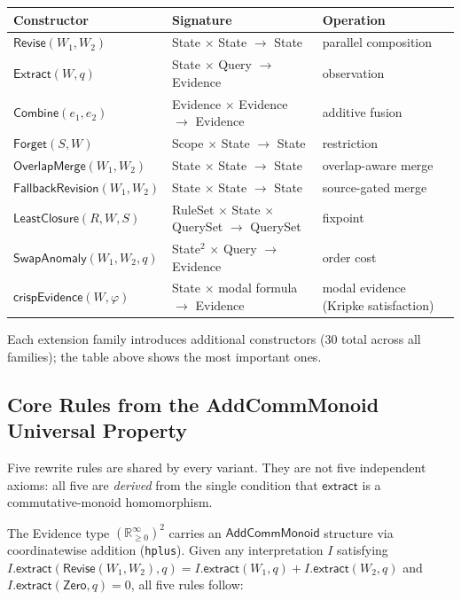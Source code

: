 \documentclass[11pt,openany]{report}
\begin{document}
\begin{center}
\begin{tabular}{lll}
\toprule
\textbf{Constructor} & \textbf{Signature} & \textbf{Operation} \\
\midrule
$\mathsf{Revise}(W_1, W_2)$ & State $\times$ State $\to$ State & parallel composition \\
$\mathsf{Extract}(W, q)$ & State $\times$ Query $\to$ Evidence & observation \\
$\mathsf{Combine}(e_1, e_2)$ & Evidence $\times$ Evidence $\to$ Evidence & additive fusion \\
$\mathsf{Forget}(S, W)$ & Scope $\times$ State $\to$ State & restriction \\
$\mathsf{OverlapMerge}(W_1, W_2)$ & State $\times$ State $\to$ State & overlap-aware merge \\
$\mathsf{FallbackRevision}(W_1, W_2)$ & State $\times$ State $\to$ State & source-gated merge \\
$\mathsf{LeastClosure}(R, W, S)$ & RuleSet $\times$ State $\times$ QuerySet $\to$ QuerySet & fixpoint \\
$\mathsf{SwapAnomaly}(W_1, W_2, q)$ & State$^2$ $\times$ Query $\to$ Evidence & order cost \\
$\mathsf{crispEvidence}(W, \varphi)$ & State $\times$ modal formula $\to$ Evidence & modal evidence (Kripke satisfaction) \\
\bottomrule
\end{tabular}
\end{center}

Each extension family introduces additional constructors (30 total across
all families); the table above shows the most important ones.

\subsection{Core Rules from the AddCommMonoid Universal Property}
\label{sec:wm-evidence-bridge}

Five rewrite rules are shared by every variant.  They are not five
independent axioms: all five are \emph{derived} from the single condition
that $\mathsf{extract}$ is a commutative-monoid homomorphism.

The Evidence type $(\mathbb{R}_{\ge0}^{\infty})^2$ carries an
$\mathsf{AddCommMonoid}$ structure via coordinatewise addition
(\texttt{hplus}).  Given any interpretation $I$ satisfying
$I.\mathsf{extract}(\mathsf{Revise}(W_1, W_2), q) =
I.\mathsf{extract}(W_1, q) + I.\mathsf{extract}(W_2, q)$ and
$I.\mathsf{extract}(\mathsf{Zero}, q) = 0$, all five rules follow:
\end{document}
